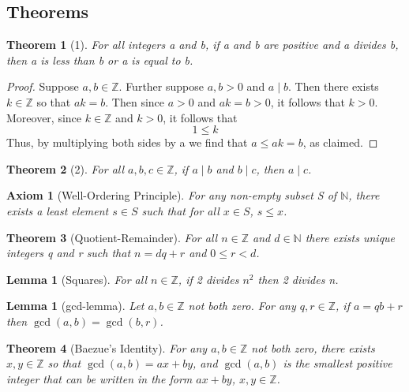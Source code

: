 \documentclass[12pt]{article}
\newtheorem*{thm*}{Theorem}
\newtheorem{lem}[thm]{Lemma}  %
\newtheorem{axi}[thm]{Axiom}
\theoremstyle{definition}
\theoremstyle{remark}
\numberwithin{equation}{section}
\newcommand\Z{\mathbb Z}    %
\newcommand\N{\mathbb N}    %
\begin{document}
\subsection{Theorems}


\begin{thm*}[1]
        For all integers a and b, if a and b are positive and a divides b, then a is less than b or a is equal to b.
\end{thm*}
\begin{proof}
        Suppose $a,b \in \Z$. Further suppose $a,b > 0$ and $a\;\vert\;b$. Then there exists $k \in \Z$ so that $ak = b$. Then since $a > 0$ and $ak = b > 0$, it follows that $k > 0$. Moreover, since $k \in \Z$ and $k > 0$, it follows that $$1 \leq k$$ Thus, by multiplying both sides by a we find that $a \leq ak = b$, as claimed.         
\end{proof}




\begin{thm*}[2]
        For all $a,b,c \in \Z$, if $a\;\vert\;b$ and $b\;\vert\;c$, then $a\;\vert\;c$.
\end{thm*}


\begin{axi}[Well-Ordering Principle]
        For any non-empty subset S of $\N$, there exists a least element $s \in S$ such that for all $x \in S$, $s \leq x$.
\end{axi}


\begin{thm*}[Quotient-Remainder]
        For all $n \in \Z$ and $d \in \N$ there exists unique integers q and r such that $n = dq + r$ and $0 \leq r < d$.
\end{thm*}




\begin{lem}[Squares]
        For all $n \in \Z$, if 2 divides $n^2$ then 2 divides n.
\end{lem}


\begin{lem}[gcd-lemma]
        Let $a,b \in \Z$ not both zero. For any $q,r \in \Z$, if $a = qb + r$ then $\gcd(a,b) = \gcd(b,r)$.
\end{lem}


\begin{thm*}[Baezue's Identity]
        For any $a,b \in \Z$ not both zero, there exists $x,y \in \Z$ so that $\gcd(a,b) = ax + by$, and $\gcd(a,b)$ is the smallest positive integer that can be written in the form $ax + by$, $x,y \in \Z$.
\end{thm*}
\end{document}
